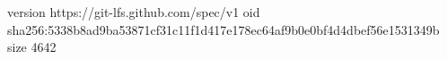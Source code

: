 version https://git-lfs.github.com/spec/v1
oid sha256:5338b8ad9ba53871cf31c11f1d417e178ec64af9b0e0bf4d4dbef56e1531349b
size 4642
